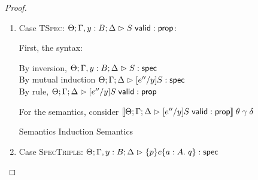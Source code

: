 \begin{proof}
\begin{enumerate}
  For the semantics, consider $\interp{\judgeA[\Theta; \Gamma; \Delta]{[e''/y]p}{\omega}}\;\theta\;\gamma\;\delta$ \\
  \begin{eqnproof}
          {Semantics}
          {Induction}
          {Semantics}
  \end{eqnproof}

\item Case \textsc{TSpec}: $\judgeA[\Theta; \Gamma, y:B; \Delta]{\validprop{S}}{\assert}$:
  
  First, the syntax:
  \begin{tabbedproof}
    \oo By inversion, $\judgeS[\Theta; \Gamma, y:B; \Delta]{S}$ \\
    \oo By mutual induction $\judgeS[\Theta; \Gamma; \Delta]{[e''/y]S}$\\
    \oo By rule, $\judgeA[\Theta; \Gamma; \Delta]{[e''/y]\validprop{S}}{\assert}$
  \end{tabbedproof}

  For the semantics, consider $\interp{\judgeA[\Theta; \Gamma; \Delta]{[e''/y]\validprop{S}}{\assert}}\;\theta\;\gamma\;\delta$ 
  \begin{eqnproof}
          {Semantics}
          {Induction}
          {Semantics}
  \end{eqnproof}

\item Case \textsc{SpecTriple}: $\judgeS[\Theta; \Gamma, y:B; \Delta]{\spec{p}{c}{a:A}{q}}$
  

\end{enumerate}
\end{proof}
